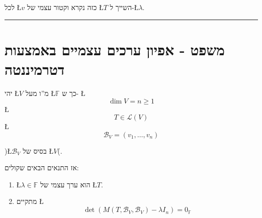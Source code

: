 \documentclass[english,hebrew]{article}
\theoremstyle{plain}
\begin{document}
לכל \L{$v$} כזה נקרא וקטור עצמי של \L{$T$} השייך ל-\L{$\lambda$}. 

\rule[0.5ex]{1\columnwidth}{1pt}

\section{משפט - אפיון ערכים עצמיים באמצעות דטרמיננטה}

יהי \L{$V$} מ\textquotedblright ו מעל \L{$\mathbb{F}$} כך ש- \L{%
\[
\dim V=n\geq1
\]
}%
\L{%
\[
T\in\mathcal{L}(V)
\]
}%
\L{%
\[
\mathcal{B}_{V}=(v_{1},\dots,v_{n})
\]
}%

)\L{$\mathcal{B}_{V}$} בסיס של \L{$V$}(. 

אז התנאים הבאים שקולים: 
\begin{enumerate}
\item \L{$\lambda\in\mathbb{F}$} הוא ערך עצמי של \L{$T$}. 
\item מתקיים \L{%
\[
\det(M(T,\mathcal{B}_{V},\mathcal{B}_{V})-\lambda I_{n})=0_{\mathbb{F}}
\]
}%
\end{enumerate}
\end{document}
